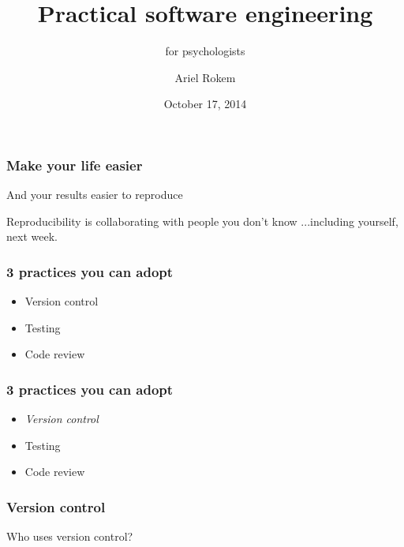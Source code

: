 \documentclass{beamer}
\title[Practical software engineering]{Practical software engineering }
\subtitle{for psychologists}
\author[Ariel Rokem]
{Ariel Rokem}
\date{October 17, 2014}
\institute[Stanford University]
{Stanford University}
\begin{document}
\begin{frame}
  \titlepage

\end{frame}


\begin{frame}
\frametitle{Make your life easier}
\pause
And your results easier to reproduce
\end{frame}

\begin{frame}
\pause
Reproducibility is collaborating with people you don't know
\pause 
...including yourself, next
week. \footnotemark[1]

\end{frame}

\begin{frame}
\frametitle{3 practices you can adopt}
\begin{itemize}
\pause
\item
Version control
\pause
\item
Testing
\pause
\item
Code review 
\end{itemize}
\end{frame}

\begin{frame}
\frametitle{3 practices you can adopt}
\begin{itemize}
\item
\emph{Version control}
\item
Testing
\item
Code review 
\end{itemize}
\end{frame}

\begin{frame}
\frametitle{Version control}
Who uses version control?
\end{frame}
\end{document}
